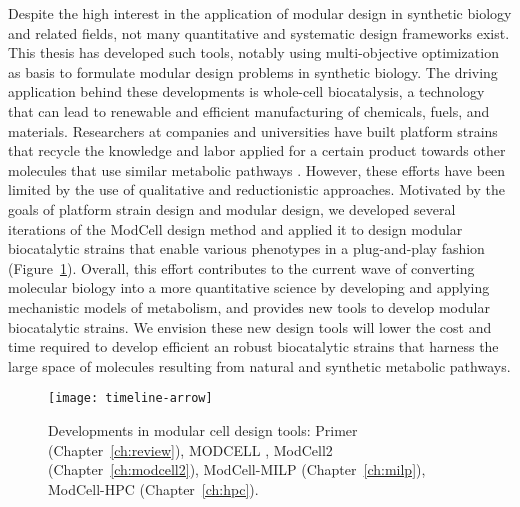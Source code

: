 Despite the high interest in the application of modular design in synthetic biology and related fields,
not many quantitative and systematic design frameworks exist.
This thesis has developed such tools, notably using multi-objective optimization as basis to formulate modular design problems in synthetic biology.
The driving application behind these developments is whole-cell biocatalysis, a technology that can lead to renewable and efficient manufacturing of chemicals, fuels, and materials.
Researchers at companies and universities have built platform strains that recycle the knowledge and labor applied for a certain product towards other molecules that use similar metabolic pathways \citep{nielsen2016}.
However, these efforts have been limited by the use of qualitative and reductionistic approaches.
Motivated by the goals of platform strain design and modular design, we developed several iterations of the ModCell design method and applied it to design modular biocatalytic strains that enable various phenotypes in a plug-and-play fashion (Figure~\ref{fig8:arrow}).
Overall, this effort contributes to the current wave of converting molecular biology into a more quantitative science by developing and applying mechanistic models of metabolism, and provides new tools to develop modular biocatalytic strains.
We envision these new design tools will lower the cost and time required to develop efficient an robust biocatalytic strains that harness the large space of molecules resulting from natural and synthetic metabolic pathways.

\begin{figure}[h]
  \centering
  \texttt{[image: timeline-arrow]}
    \caption[Developments in modular cell design tools]{Developments in modular cell design tools: Primer (Chapter~\ref{ch:review}), MODCELL \citep{trinh2015}, ModCell2 (Chapter~\ref{ch:modcell2}), ModCell-MILP (Chapter~\ref{ch:milp}), ModCell-HPC (Chapter~\ref{ch:hpc}).}
    \label{fig8:arrow}
\end{figure}


